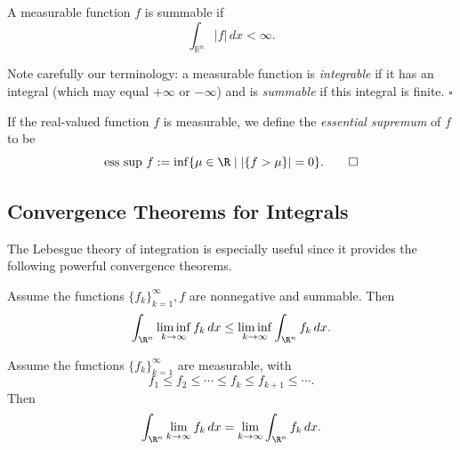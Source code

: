 \begin{definition}
\label{def:summable-function}
A measurable function $f$ is summable if
$$\int_{\mathbb{R}^n} |f| \, dx < \infty.$$
\end{definition}

\begin{remark}
\label{rem:integrable-vs-summable-terminology}
Note carefully our terminology: a measurable function is \textit{integrable} if it has an integral (which may equal $+\infty$ or $-\infty$) and is \textit{summable} if this integral is finite. $\square$
\end{remark}

\begin{definition}
\label{def:essential-supremum}
If the real-valued function $f$ is measurable, we define the \textit{essential supremum} of $f$ to be
$$\text{ess sup } f := \inf\{\mu \in \R \mid |\{f > \mu\}| = 0\}. \qquad \square$$
\end{definition}

\subsection{Convergence Theorems for Integrals}
\label{sec:convergence-theorems-for-integrals}

The Lebesgue theory of integration is especially useful since it provides the following powerful convergence theorems.

\begin{theorem}
\label{thm:fatous-lemma}
Assume the functions $\{f_k\}_{k=1}^{\infty}, f$ are nonnegative and summable. Then
$$\int_{\R^n} \liminf_{k \to \infty} f_k \, dx \leq \liminf_{k \to \infty} \int_{\R^n} f_k \, dx.$$
\end{theorem}

\begin{theorem}
\label{thm:monotone-convergence-theorem}
Assume the functions $\{f_k\}_{k=1}^{\infty}$ are measurable, with
$$f_1 \leq f_2 \leq \cdots \leq f_k \leq f_{k+1} \leq \cdots.$$
Then
$$\int_{\R^n} \lim_{k \to \infty} f_k \, dx = \lim_{k \to \infty} \int_{\R^n} f_k \, dx.$$
\end{theorem}

